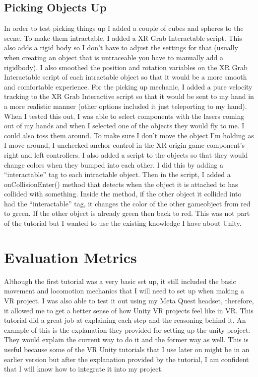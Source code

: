 \documentclass[11pt,twocolumn]{article}
\begin{document}
\subsection{Picking Objects Up}
In order to test picking things up I added a couple of cubes and spheres to the scene. To make them intractable, I added a XR Grab Interactable script. This also adds a rigid body so I don’t have to adjust the settings for that (usually when creating an object that is untraceable you have to manually add a rigidbody). I also smoothed the position and rotation variables on the XR Grab Interactable script of each intractable object so that it would be a more smooth and comfortable experience. For the picking up mechanic, I added a pure velocity tracking  to the XR Grab Interactive script so that it would be sent to my hand in a more realistic manner (other options included it just teleporting to my hand). When I tested this out, I was able to select components with the lasers coming out of my hands and when I selected one of the objects they would fly to me. I could also toss them around. To make sure I don’t move the object I’m holding as I move around, I unchecked anchor control in the XR origin game component’s right and left controllers. I also added a script to the objects so that they would change colors when they bumped into each other. I did this by adding a “interactable” tag to each intractable object. Then in the script, I added a onCollisionEnter() method that detects when the object it is attached to has collided with something. Inside the method, if the other object it collided into had the “interactable” tag, it changes the color of the other gameobject from red to green. If the other object is already green then back to red. This was not part of the tutorial but I wanted to use the existing knowledge I have about Unity. 

\section{Evaluation Metrics}
Although the first tutorial was a very basic set up, it still included the basic movement and locomotion mechanics that I will need to set up when making a VR project. I was also able to test it out using my Meta Quest headset, therefore, it allowed me to get a better sense of how Unity VR projects feel like in VR. This tutorial did a great job at explaining each step and the reasoning behind it. An example of this is the explanation they provided for setting up the unity project. They would explain the current way to do it and the former way as well. This is useful because some of the VR Unity tutorials that I use later on might be in an earlier version but after the explanation provided by the tutorial, I am confident that I will know how to integrate it into my project. 
\end{document}
